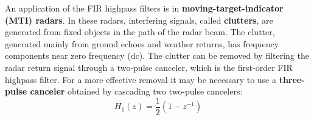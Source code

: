 \documentclass[../../main/main.tex]{subfiles}
\begin{document}
An application of the FIR highpass filters is in \textbf{moving-target-indicator (MTI) radars}. In these radars, interfering signals, called \textbf{clutters}, are generated from fixed objects in the path of the radar beam. The clutter, generated mainly from ground echoes and weather returns, has frequency components near zero frequency (dc).
The clutter can be removed by filtering the radar return signal through a two-pulse canceler, which is the first-order FIR highpass filter. For a more effective removal it may be necessary to use a \textbf{three-pulse canceler} obtained by cascading two two-pulse cancelers:
\begin{equation}
    H_{1}(z)
    =
    \frac{1}{2} (1 - z^{-1})
    \label{eq:L19_S32_1}
\end{equation}
\end{document}
